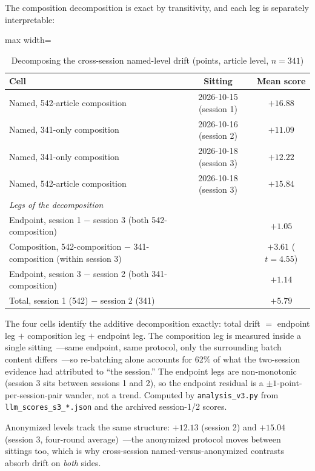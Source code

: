 The composition decomposition is exact by transitivity, and each leg is separately interpretable:

\begin{table}[htbp]
\centering
\small
\caption{Decomposing the cross-session named-level drift (points, article level, $n=341$)}
\label{tab:comp}
\begin{adjustbox}{max width=\textwidth}
\begin{tabular}{lcc}
\toprule
Cell & Sitting & Mean score \\
\midrule
Named, 542-article composition & 2026-10-15 (session 1) & $+16.88$ \\
Named, 341-only composition & 2026-10-16 (session 2) & $+11.09$ \\
Named, 341-only composition & 2026-10-18 (session 3) & $+12.22$ \\
Named, 542-article composition & 2026-10-18 (session 3) & $+15.84$ \\
\midrule
\multicolumn{3}{l}{\emph{Legs of the decomposition}} \\
Endpoint, session 1 $-$ session 3 (both 542-composition) & & $+1.05$ \\
Composition, 542-composition $-$ 341-composition (within session 3) & & $+3.61$ ($t=4.55$) \\
Endpoint, session 3 $-$ session 2 (both 341-composition) & & $+1.14$ \\
Total, session 1 (542) $-$ session 2 (341) & & $+5.79$ \\
\bottomrule
\end{tabular}
\end{adjustbox}
\begin{tablenotes}[flushleft]\footnotesize
\item The four cells identify the additive decomposition exactly: total drift $=$ endpoint leg $+$ composition leg $+$ endpoint leg. The composition leg is measured inside a single sitting~---same endpoint, same protocol, only the surrounding batch content differs~---so re-batching alone accounts for 62\% of what the two-session evidence had attributed to ``the session.'' The endpoint legs are non-monotonic (session 3 sits between sessions 1 and 2), so the endpoint residual is a $\pm1$-point-per-session-pair wander, not a trend. Computed by \texttt{analysis\_v3.py} from \texttt{llm\_scores\_s3\_*.json} and the archived session-1/2 scores.
\end{tablenotes}
\end{table}

Anonymized levels track the same structure: $+12.13$ (session 2) and $+15.04$ (session 3, four-round average)~---the anonymized protocol moves between sittings too, which is why cross-session named-versus-anonymized contrasts absorb drift on \emph{both} sides.

